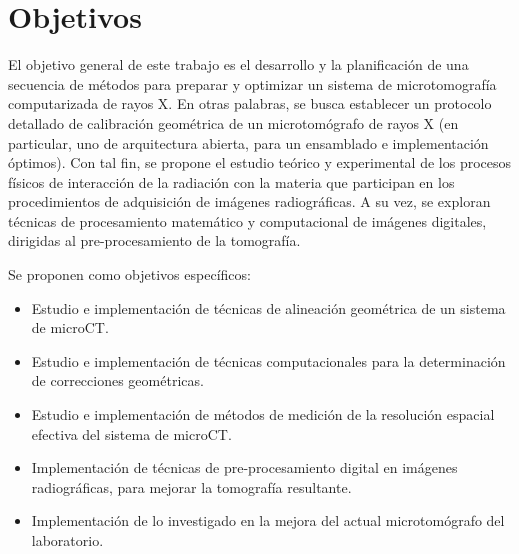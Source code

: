 \section{Objetivos}

El objetivo general de este trabajo es el desarrollo y la planificación de
una secuencia de métodos para preparar y optimizar un 
sistema de microtomografía computarizada de rayos X. En otras palabras, se
busca establecer un protocolo detallado de calibración geométrica
de un microtomógrafo de rayos X (en particular, uno de arquitectura abierta,
para un ensamblado e implementación óptimos). Con tal fin, se propone el estudio
teórico y experimental de los procesos físicos de interacción de la radiación
con la materia que participan en los procedimientos de adquisición de imágenes
radiográficas. A su vez, se exploran técnicas de procesamiento matemático y computacional
de imágenes digitales, dirigidas al pre-procesamiento de la tomografía.

\vspace{5mm}

Se proponen como objetivos específicos:

\begin{itemize}
    \item Estudio e implementación de técnicas de alineación geométrica de un 
    sistema de microCT.
    \item Estudio e implementación de técnicas computacionales para la determinación
    de correcciones geométricas.
    \item Estudio e implementación de métodos de medición de la resolución espacial
    efectiva del sistema de microCT.
    \item Implementación de técnicas de pre-procesamiento digital en imágenes
    radiográficas, para mejorar la tomografía resultante.
    \item Implementación de lo investigado en la mejora del actual microtomógrafo
    del laboratorio.
\end{itemize}